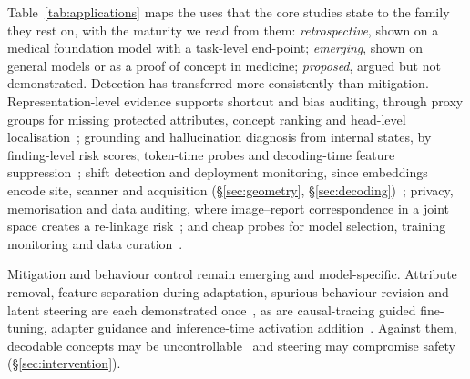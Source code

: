 Table~\ref{tab:applications} maps the uses that the core studies state to the family they rest on, with
the maturity we read from them: \emph{retrospective}, shown on a medical foundation model with a
task-level end-point; \emph{emerging}, shown on general models or as a proof of concept in medicine;
\emph{proposed}, argued but not demonstrated. Detection has transferred more consistently than
mitigation. Representation-level evidence supports shortcut and bias auditing, through proxy groups for
missing protected attributes, concept ranking and head-level
localisation~\cite{queiroz2024using,bahre2025underdiagnosis,bhattacharyya2025conformal,yang2024demographic,brown2022detecting,yang2024the,janizek2026visual,yasser2026locating};
grounding and hallucination diagnosis from internal states, by finding-level risk scores, token-time
probes and decoding-time feature
suppression~\cite{hardy2024rextrust,yu2026realtime,nooralahzadeh2026universal,li2026suppressing,phukan2024beyond,li2025the,kossen2024semantic};
shift detection and deployment monitoring, since embeddings encode site, scanner and acquisition
(\S\ref{sec:geometry},
\S\ref{sec:decoding})~\cite{dejong2025current,mishra2025comparing,donle2026featmap,disalvo2026mars,poceviciute2024outofdistribution,schulthess2025anomaly,das2026proton};
privacy, memorisation and data auditing, where image--report correspondence in a joint space creates a
re-linkage
risk~\cite{tayebiarasteh2026crossmodal,tonekaboni2025an,deo2026a,hardan2025forgetmi,nasirigerdeh2024machine,zhang2026auditing,xu2026a};
and cheap probes for model selection, training monitoring and data
curation~\cite{liang2026cheap,chen2025revisiting}.

Mitigation and behaviour control remain emerging and model-specific. Attribute removal, feature
separation during adaptation, spurious-behaviour revision and latent steering are each demonstrated
once~\cite{zheng2025towards,huang2025knowledgeguided,pahde2025ensuring,ahsan2025can}, as are
causal-tracing guided fine-tuning, adapter guidance and inference-time activation
addition~\cite{abbasi2026layerspecific,sadanandan2026mechanistically,farina2026translating}. Against
them, decodable concepts may be uncontrollable~\cite{basu2026interpretability} and steering may
compromise safety~\cite{korznikov2025the,li2026analysing} (\S\ref{sec:intervention}).

